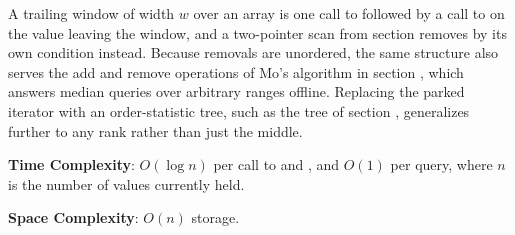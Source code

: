 A trailing window of width $w$ over an array is one call to  followed by a call to  on the value leaving the window, and a two-pointer scan from section  removes by its own condition instead. Because removals are unordered, the same structure also serves the add and remove operations of Mo's algorithm in section , which answers median queries over arbitrary ranges offline. Replacing the parked iterator with an order-statistic tree, such as the  tree of section , generalizes further to any rank rather than just the middle.

\textbf{Time Complexity}: $O(\log n)$ per call to  and , and $O(1)$ per query, where $n$ is the number of values currently held.

\textbf{Space Complexity}: $O(n)$ storage.

